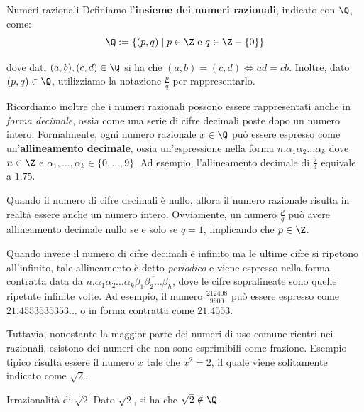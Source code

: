 \documentclass[a4paper, 12pt]{report}
\begin{document}
    \begin{frameddefn}{Numeri razionali}
        Definiamo l'\textbf{insieme dei numeri razionali}, indicato con $\Q$, come:
        \[\Q := \{(p,q) \mid p \in \Z \text{ e } q \in \Z-\{0\}\}\]

        dove dati $(a,b), (c,d) \in \Q$ si ha che $(a,b) = (c,d) \iff ad = cb$. Inoltre, dato $(p,q) \in \Q$, utilizziamo la notazione $\frac{p}{q}$ per rappresentarlo.
    \end{frameddefn}

    Ricordiamo inoltre che i numeri razionali possono essere rappresentati anche in \textit{forma decimale}, ossia come una serie di cifre decimali poste dopo un numero intero. Formalmente, ogni numero razionale $x \in \Q$ può essere espresso come un'\textbf{allineamento decimale}, ossia un'espressione nella forma $n.\alpha_1 \alpha_2 \ldots \alpha_k$ dove $n \in \Z$ e $\alpha_1, \ldots, \alpha_k \in \{0, \ldots, 9\}$. Ad esempio, l'allineamento decimale di $\frac{7}{4}$ equivale a $1.75$.

    Quando il numero di cifre decimali è nullo, allora il numero razionale risulta in realtà essere anche un numero intero. Ovviamente, un numero $\frac{p}{q}$ può avere allineamento decimale nullo se e solo se $q = 1$, implicando che $p \in \Z$.

    Quando invece il numero di cifre decimali è infinito ma le ultime cifre si ripetono all'infinito, tale allineamento è detto \textit{periodico} e viene espresso nella forma contratta data da $n.\alpha_1 \alpha_2 \ldots \alpha_k \overline{\beta_1 \beta_2 \ldots \beta_h}$, dove le cifre sopralineate sono quelle ripetute infinite volte. Ad esempio, il numero $\frac{212408}{9900}$ può essere espresso come $21.4553535353\ldots$ o in forma contratta come $21.45\overline{53}$.
    
    Tuttavia, nonostante la maggior parte dei numeri di uso comune rientri nei razionali, esistono dei numeri che non sono esprimibili come frazione. Esempio tipico risulta essere il numero $x$ tale che $x^2 = 2$, il quale viene solitamente indicato come $\sqrt{2}$.

    \begin{framedlem}{Irrazionalità di $\sqrt{2}$}
        Dato $\sqrt{2}$, si ha che $\sqrt{2} \notin \Q$.
    \end{framedlem}
\end{document}
